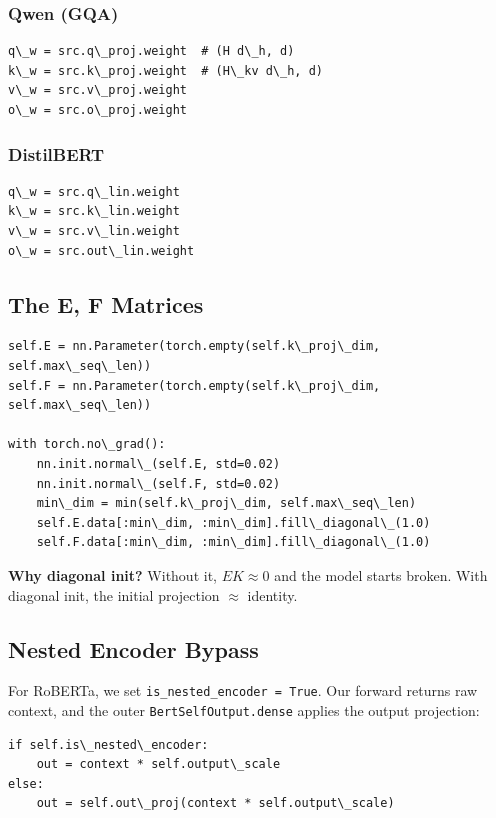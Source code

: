 \subsubsection{Qwen (GQA)}

\begin{lstlisting}
q\_w = src.q\_proj.weight  # (H d\_h, d)
k\_w = src.k\_proj.weight  # (H\_kv d\_h, d)
v\_w = src.v\_proj.weight
o\_w = src.o\_proj.weight
\end{lstlisting}

\subsubsection{DistilBERT}

\begin{lstlisting}
q\_w = src.q\_lin.weight
k\_w = src.k\_lin.weight
v\_w = src.v\_lin.weight
o\_w = src.out\_lin.weight
\end{lstlisting}

\subsection{The E, F Matrices}

\begin{lstlisting}
self.E = nn.Parameter(torch.empty(self.k\_proj\_dim, self.max\_seq\_len))
self.F = nn.Parameter(torch.empty(self.k\_proj\_dim, self.max\_seq\_len))

with torch.no\_grad():
    nn.init.normal\_(self.E, std=0.02)
    nn.init.normal\_(self.F, std=0.02)
    min\_dim = min(self.k\_proj\_dim, self.max\_seq\_len)
    self.E.data[:min\_dim, :min\_dim].fill\_diagonal\_(1.0)
    self.F.data[:min\_dim, :min\_dim].fill\_diagonal\_(1.0)
\end{lstlisting}

\textbf{Why diagonal init?} Without it, $E K \approx 0$ and the model starts 
broken. With diagonal init, the initial projection $\approx$ identity.

\subsection{Nested Encoder Bypass}

For RoBERTa, we set \texttt{is\_nested\_encoder = True}. Our forward returns raw 
context, and the outer \texttt{BertSelfOutput.dense} applies the output projection:

\begin{lstlisting}
if self.is\_nested\_encoder:
    out = context * self.output\_scale
else:
    out = self.out\_proj(context * self.output\_scale)
\end{lstlisting}

